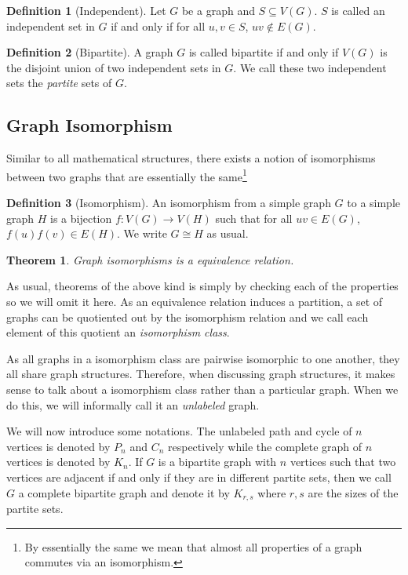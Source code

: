 \documentclass[
]{article}
\newtheorem{theorem}{Theorem}
\theoremstyle{definition}
\newtheorem{definition}{Definition}[section]
\begin{document}
\begin{definition}[Independent]
  Let \(G\) be a graph and \(S \subseteq V(G)\). \(S\) is called an independent 
  set in \(G\) if and only if for all \(u, v \in S\), \(uv \notin E(G)\).
\end{definition}

\begin{definition}[Bipartite]
  A graph \(G\) is called bipartite if and only if \(V(G)\) is the disjoint 
  union of two independent sets in \(G\). We call these two independent sets the 
  \textit{partite} sets of \(G\).
\end{definition}

\hypertarget{graph-isomorphism}{%
\subsection{Graph Isomorphism}\label{graph-isomorphism}}

Similar to all mathematical structures, there exists a notion of
isomorphisms between two graphs that are essentially the
same\footnote{By essentially the 
same we mean that almost all properties of a graph commutes via an isomorphism.}

\begin{definition}[Isomorphism]
  An isomorphism from a simple graph \(G\) to a simple graph \(H\) is a 
  bijection \(f : V(G) \to V(H)\) such that for all \(uv \in E(G)\), 
  \(f(u)f(v) \in E(H)\). We write \(G \cong H\) as usual.
\end{definition}

\begin{theorem}
  Graph isomorphisms is a equivalence relation.
\end{theorem}

As usual, theorems of the above kind is simply by checking each of the
properties so we will omit it here. As an equivalence relation induces a
partition, a set of graphs can be quotiented out by the isomorphism
relation and we call each element of this quotient an \emph{isomorphism
class}.

As all graphs in a isomorphism class are pairwise isomorphic to one
another, they all share graph structures. Therefore, when discussing
graph structures, it makes sense to talk about a isomorphism class
rather than a particular graph. When we do this, we will informally call
it an \emph{unlabeled} graph.

We will now introduce some notations. The unlabeled path and cycle of
\(n\) vertices is denoted by \(P_n\) and \(C_n\) respectively while the
complete graph of \(n\) vertices is denoted by \(K_n\). If \(G\) is a
bipartite graph with \(n\) vertices such that two vertices are adjacent
if and only if they are in different partite sets, then we call \(G\) a
complete bipartite graph and denote it by \(K_{r, s}\) where \(r, s\)
are the sizes of the partite sets.
\end{document}
